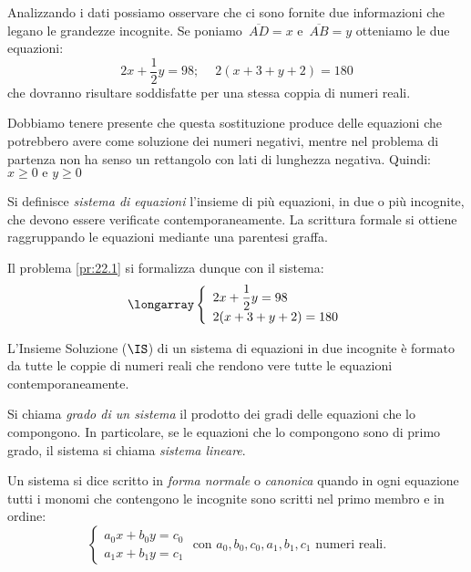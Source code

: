 Analizzando i dati possiamo osservare che ci sono fornite due
informazioni che legano le grandezze incognite. 
Se poniamo~$\overline{AD}=x$ e~$\overline{AB}=y$
otteniamo le due equazioni:
\[2x+\frac{1}{2}y=98;\quad~2(x+3+y+2)=180\]
che dovranno risultare soddisfatte per una stessa coppia di numeri
reali.

\begin{osservazione}
 Dobbiamo tenere presente che questa sostituzione produce delle equazioni 
 che potrebbero avere come soluzione dei numeri negativi, mentre nel problema 
 di partenza non ha senso un rettangolo con lati di lunghezza negativa.
 Quindi:~$x \geqslant 0 \text{ e } y \geqslant 0$
\end{osservazione}

\begin{definizione}
Si definisce \emph{sistema di equazioni} l'insieme di più equazioni, 
in due o più incognite,
che devono essere verificate contemporaneamente. La scrittura formale
si ottiene raggruppando le equazioni mediante una parentesi graffa.
\end{definizione}

Il problema \ref{pr:22.1} si formalizza dunque con il sistema:
\[\longarray\left\{\begin{array}{l}
 2x+\dfrac{1}{2}y=98 \\
 2(x+3+y+2)=180
\end{array}\right.\]

\begin{definizione}
L'Insieme Soluzione ($\IS$) di un sistema di equazioni in
due incognite è formato da tutte le coppie di numeri reali
che rendono vere tutte le equazioni
contemporaneamente.
\end{definizione}

\begin{definizione}
Si chiama \emph{grado di un sistema} il prodotto dei gradi delle
equazioni che lo compongono. In particolare, se le equazioni che lo
compongono sono di primo grado, il sistema si chiama \emph{sistema lineare}.
\end{definizione}

\begin{definizione}
Un sistema si dice scritto in \emph{forma normale} o \emph{canonica} 
quando in ogni equazione tutti i monomi che contengono le incognite sono 
scritti nel primo membro e in ordine:
\[\left\{\begin{array}{l}
 a_{0}x+b_{0}y=c_{0} \\
 a_{1}x+b_{1}y=c_{1} 
\end{array}\right.
\text{ con }a_{0}, b_{0}, c_{0}, a_{1}, b_{1}, c_{1}\text{ numeri reali.}\]
\end{definizione}

